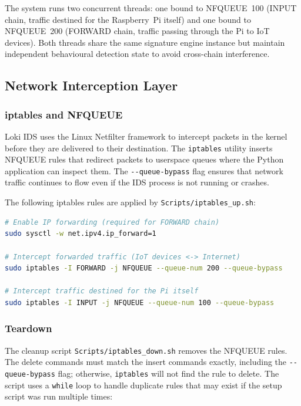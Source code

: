 \documentclass[12pt,a4paper]{article}
\begin{document}
The system runs two concurrent threads: one bound to NFQUEUE~100 (INPUT chain, traffic destined for the Raspberry~Pi itself) and one bound to NFQUEUE~200 (FORWARD chain, traffic passing through the Pi to IoT devices). Both threads share the same signature engine instance but maintain independent behavioural detection state to avoid cross-chain interference.

\subsection{Network Interception Layer}
\label{sec:interception}

\subsubsection{iptables and NFQUEUE}

Loki IDS uses the Linux Netfilter framework to intercept packets in the kernel before they are delivered to their destination. The \texttt{iptables} utility inserts NFQUEUE rules that redirect packets to userspace queues where the Python application can inspect them. The \texttt{-{}-queue-bypass} flag ensures that network traffic continues to flow even if the IDS process is not running or crashes.

The following iptables rules are applied by \texttt{Scripts/iptables\_up.sh}:

\begin{lstlisting}[language=bash]
# Enable IP forwarding (required for FORWARD chain)
sudo sysctl -w net.ipv4.ip_forward=1

# Intercept forwarded traffic (IoT devices <-> Internet)
sudo iptables -I FORWARD -j NFQUEUE --queue-num 200 --queue-bypass

# Intercept traffic destined for the Pi itself
sudo iptables -I INPUT -j NFQUEUE --queue-num 100 --queue-bypass
\end{lstlisting}

\subsubsection{Teardown}

The cleanup script \texttt{Scripts/iptables\_down.sh} removes the NFQUEUE rules. The delete commands must match the insert commands exactly, including the \texttt{-{}-queue-bypass} flag; otherwise, \texttt{iptables} will not find the rule to delete. The script uses a \texttt{while} loop to handle duplicate rules that may exist if the setup script was run multiple times:
\end{document}
